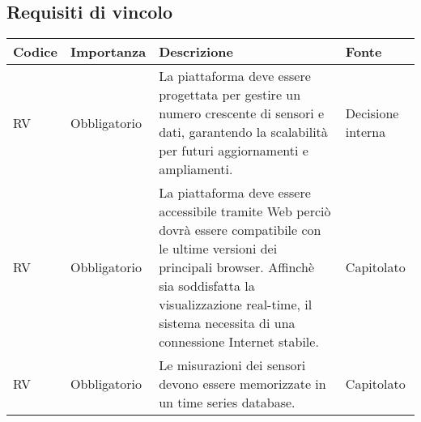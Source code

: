 \subsection{Requisiti di vincolo}
\setcounter{rowcounter}{0}
\begin{longtable}{|C{1.5cm}|C{2cm}|L{5cm}|C{2cm}|}
    \hline
    \textbf{Codice} & \textbf{Importanza} & \textbf{Descrizione} & \textbf{Fonte}  \\

    \hline
     RV & Obbligatorio & La piattaforma deve essere progettata per gestire un numero crescente di sensori e dati, garantendo la scalabilità per futuri aggiornamenti e ampliamenti. & Decisione interna \\

    \hline
     RV & Obbligatorio & La piattaforma deve essere accessibile tramite Web perciò dovrà essere compatibile con le ultime versioni dei principali browser. Affinchè sia soddisfatta la visualizzazione real-time, il sistema necessita di una connessione Internet stabile. & Capitolato \\   

    \hline
     RV & Obbligatorio & Le misurazioni dei sensori devono essere memorizzate in un time series database. & Capitolato \\   
    
    \hline
\end{longtable}




